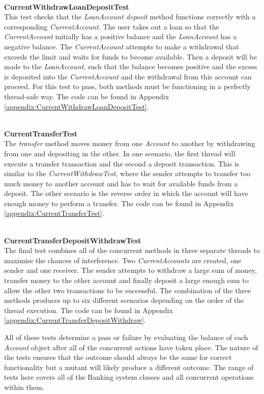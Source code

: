 \documentclass[a4paper,12pt]{article}
\begin{document}
\textbf{\\CurrentWithdrawLoanDepositTest}
\\This test checks that the \textit{LoanAccount deposit} method functions correctly with a corresponding \textit{CurrentAccount}. The user takes out a loan so that the \textit{CurrentAccount} initially has a positive balance and the \textit{LoanAccount} has a negative balance. The \textit{CurrentAccount} attempts to make a withdrawal that exceeds the limit and waits for funds to become available. Then a deposit will be made to the \textit{LoanAccount}, such that the balance becomes positive and the excess is deposited into the \textit{CurrentAccount} and the withdrawal from this account can proceed. For this test to pass, both methods must be functioning in a perfectly thread-safe way. The code can be found in Appendix \ref{appendix:CurrentWithdrawLoanDepositTest}.   

\textbf{\\CurrentTransferTest}
\\The \textit{transfer} method moves money from one \textit{Account} to another by withdrawing from one and depositing in the other. In one scenario, the first thread will execute a transfer transaction and the second a deposit transaction. This is similar to the \textit{CurrentWithdrawTest}, where the sender attempts to transfer too much money to another account and has to wait for available funds from a deposit. The other scenario is the reverse order in which the account will have enough money to perform a transfer. The code can be found in Appendix \ref{appendix:CurrentTransferTest}.   

\textbf{\\CurrentTransferDepositWithdrawTest}
\\The final test combines all of the concurrent methods in three separate threads to maximise the chances of interference. Two \textit{CurrentAccounts} are created, one sender and one receiver. The sender attempts to withdraw a large sum of money, transfer money to the other account and finally deposit a large enough sum to allow the other two transactions to be successful. The combination of the three methods produces up to six different scenarios depending on the order of the thread execution. The code can be found in Appendix \ref{appendix:CurrentTransferDepositWithdraw}.  

All of these tests determine a pass or failure by evaluating the balance of each \textit{Account} object after all of the concurrent actions have taken place. The nature of the tests ensures that the outcome should always be the same for correct functionality but a mutant will likely produce a different outcome. The range of tests here covers all of the Banking system classes and all concurrent operations within them.
\end{document}
